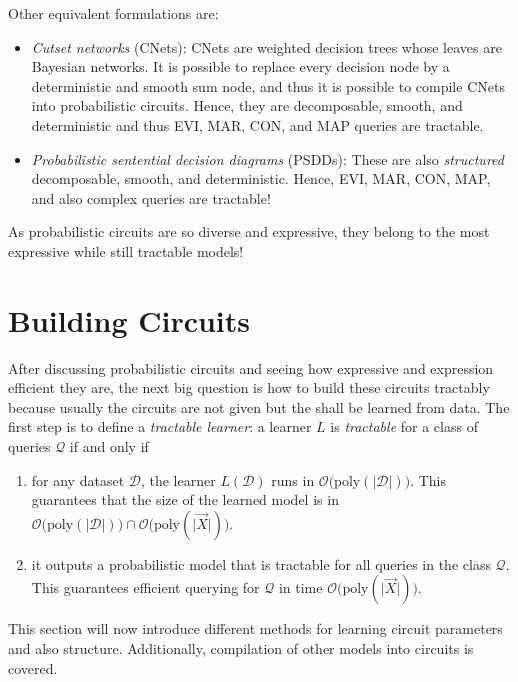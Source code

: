 				Other equivalent formulations are:
				\begin{itemize}
					\item \emph{Cutset networks} (CNets): CNets are weighted decision trees whose leaves are Bayesian networks. It is possible to replace every decision node by a deterministic and smooth sum node, and thus it is possible to compile CNets into probabilistic circuits. Hence, they are decomposable, smooth, and deterministic and thus EVI, MAR, CON, and MAP queries are tractable.
					\item \emph{Probabilistic sentential decision diagrams} (PSDDs): These are also \emph{structured} decomposable, smooth, and deterministic. Hence, EVI, MAR, CON, MAP, and also complex queries are tractable!
				\end{itemize}
				As probabilistic circuits are so diverse and expressive, they belong to the most expressive while still tractable models!

	\section{Building Circuits} %
		After discussing probabilistic circuits and seeing how expressive and expression efficient they are, the next big question is how to build these circuits tractably because usually the circuits are not given but the shall be learned from data. The first step is to define a \emph{tractable learner}: a learner \(L\) is \emph{tractable} for a class of queries \(\mathcal{Q}\) if and only if
		\begin{enumerate}
			\item for any dataset \(\mathcal{D}\), the learner \( L(\mathcal{D}) \) runs in \( \mathcal{O}\big( \mathrm{poly}(\lvert \mathcal{D} \rvert) \big) \). This guarantees that the size of the learned model is in \( \mathcal{O}\big( \mathrm{poly}(\lvert \mathcal{D} \rvert) \big) \cap \mathcal{O}\big( \mathrm{poly}(\lvert \vec{X} \rvert) \big) \).
			\item it outputs a probabilistic model that is tractable for all queries in the class \(\mathcal{Q}\). This guarantees efficient querying for \(\mathcal{Q}\) in time \( \mathcal{O}\big( \mathrm{poly}(\lvert \vec{X} \rvert) \big) \).
		\end{enumerate}
		This section will now introduce different methods for learning circuit parameters and also structure. Additionally, compilation of other models into circuits is covered.

